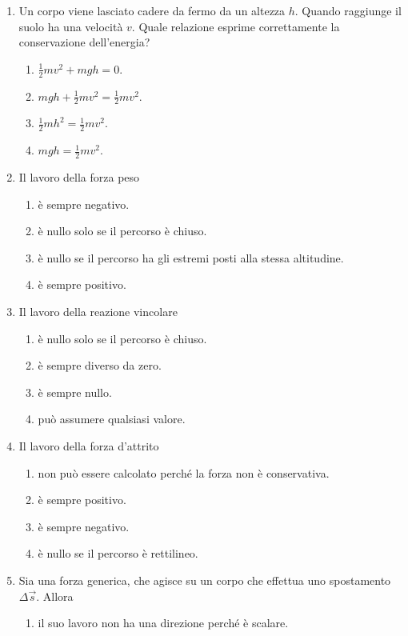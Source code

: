 \documentclass{article}
\begin{document}
\begin{enumerate}
  \item Un corpo viene lasciato cadere da fermo da un altezza $h$. Quando raggiunge il suolo ha una velocità $v$. Quale relazione esprime correttamente la conservazione dell'energia?
  \begin{enumerate}[label=\Alph*.]
    \item $\frac{1}{2}mv^2+mgh=0.$
    \item $mgh+\frac{1}{2}mv^2=\frac{1}{2}mv^2.$
    \item $\frac{1}{2}mh^2=\frac{1}{2}mv^2$.
    \item $mgh=\frac{1}{2}mv^2$.
  \end{enumerate}
  \item Il lavoro della forza peso
  \begin{enumerate}[label=\Alph*.]
    \item è sempre negativo.
    \item è nullo solo se il percorso è chiuso.
    \item è nullo se il percorso ha gli estremi posti alla stessa altitudine.
    \item è sempre positivo.
  \end{enumerate}
  \item Il lavoro della reazione vincolare
  \begin{enumerate}[label=\Alph*.]
    \item è nullo solo se il percorso è chiuso.
    \item è sempre diverso da zero.
    \item è sempre nullo.
    \item può assumere qualsiasi valore.
  \end{enumerate}
  \item Il lavoro della forza d'attrito
  \begin{enumerate}[label=\Alph*.]
    \item non può essere calcolato perché la forza non è conservativa.
    \item è sempre positivo.
    \item è sempre negativo.
    \item è nullo se il percorso è rettilineo.
  \end{enumerate}
  \item Sia  una forza generica, che agisce su un corpo che effettua uno spostamento $\Delta \vec{s}$. Allora
  \begin{enumerate}[label=\Alph*.]
    \item il suo lavoro non ha una direzione perché è scalare.

\end{enumerate}
\end{enumerate}
\end{document}
